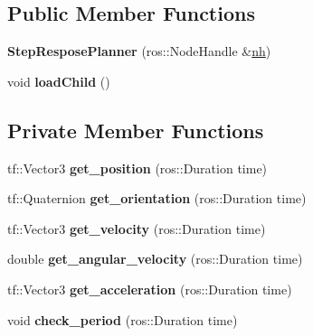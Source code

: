 \subsection*{Public Member Functions}
\begin{DoxyCompactItemize}
\item 
{\bfseries Step\+Respose\+Planner} (ros\+::\+Node\+Handle \&\hyperlink{classPlanner_a9714d036f444a07ce90be8d135b9a40c}{nh})\hypertarget{classStepResposePlanner_afefbc3a96d82bcbce781e79730307bcb}{}\label{classStepResposePlanner_afefbc3a96d82bcbce781e79730307bcb}

\item 
void {\bfseries load\+Child} ()\hypertarget{classStepResposePlanner_a2fe2221f82b19b10cf4842caedcf3c3a}{}\label{classStepResposePlanner_a2fe2221f82b19b10cf4842caedcf3c3a}

\end{DoxyCompactItemize}
\subsection*{Private Member Functions}
\begin{DoxyCompactItemize}
\item 
tf\+::\+Vector3 {\bfseries get\+\_\+position} (ros\+::\+Duration time)\hypertarget{classStepResposePlanner_a5bdbf4b5df7c662d8b9bf0c79c9226b2}{}\label{classStepResposePlanner_a5bdbf4b5df7c662d8b9bf0c79c9226b2}

\item 
tf\+::\+Quaternion {\bfseries get\+\_\+orientation} (ros\+::\+Duration time)\hypertarget{classStepResposePlanner_a93d42c102eb19c7eefb52591c2c74901}{}\label{classStepResposePlanner_a93d42c102eb19c7eefb52591c2c74901}

\item 
tf\+::\+Vector3 {\bfseries get\+\_\+velocity} (ros\+::\+Duration time)\hypertarget{classStepResposePlanner_a1045bc185b58ef79410ff1f007cbe6e9}{}\label{classStepResposePlanner_a1045bc185b58ef79410ff1f007cbe6e9}

\item 
double {\bfseries get\+\_\+angular\+\_\+velocity} (ros\+::\+Duration time)\hypertarget{classStepResposePlanner_ac608ace99798a07f710ddd7eece983f6}{}\label{classStepResposePlanner_ac608ace99798a07f710ddd7eece983f6}

\item 
tf\+::\+Vector3 {\bfseries get\+\_\+acceleration} (ros\+::\+Duration time)\hypertarget{classStepResposePlanner_a30a5fb556a1576f9f1bc5f8300147202}{}\label{classStepResposePlanner_a30a5fb556a1576f9f1bc5f8300147202}

\item 
void {\bfseries check\+\_\+period} (ros\+::\+Duration time)\hypertarget{classStepResposePlanner_afb46272417c25b3b4304412bf25bded2}{}\label{classStepResposePlanner_afb46272417c25b3b4304412bf25bded2}

\end{DoxyCompactItemize}
